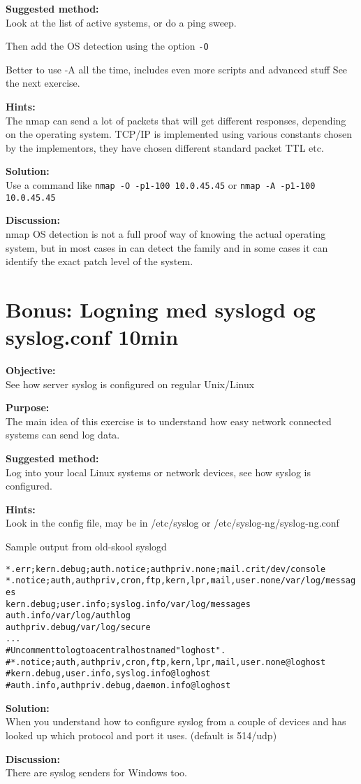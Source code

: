 \documentclass[a4paper,11pt,notitlepage]{report}
\begin{document}
{\bf Suggested method:}\\
Look at the list of active systems, or do a ping sweep.

Then add the OS detection using the option \verb+-O+

Better to use -A all the time, includes even more scripts and advanced stuff
See the next exercise.

{\bf Hints:} \\
The nmap can send a lot of packets that will get different responses, depending on the operating system. TCP/IP is implemented using various constants chosen by the implementors, they have chosen different standard packet TTL etc.

{\bf Solution:}\\
Use a command like \verb+nmap -O -p1-100 10.0.45.45+ or  \verb+nmap -A -p1-100 10.0.45.45+


{\bf Discussion:}\\
nmap OS detection is not a full proof way of knowing the actual operating system, but in most cases in can detect the family and in some cases it can identify the exact patch level of the system.


\chapter{Bonus: Logning med syslogd og syslog.conf 10min}
\label{ex:syslogd-basic}

{\bf Objective:} \\
See how server syslog is configured on regular Unix/Linux

{\bf Purpose:}\\
The main idea of this exercise is to understand how easy network connected systems can send log data.


{\bf Suggested method:}\\
Log into your local Linux systems or network devices, see how syslog is configured.

{\bf Hints:}\\
Look in the config file, may be in /etc/syslog  or /etc/syslog-ng/syslog-ng.conf

Sample output from old-skool syslogd
\begin{alltt}
\small
*.err;kern.debug;auth.notice;authpriv.none;mail.crit    /dev/console
*.notice;auth,authpriv,cron,ftp,kern,lpr,mail,user.none /var/log/messages
kern.debug;user.info;syslog.info                        /var/log/messages
auth.info                                               /var/log/authlog
authpriv.debug                                          /var/log/secure
...
# Uncomment to log to a central host named "loghost".
#*.notice;auth,authpriv,cron,ftp,kern,lpr,mail,user.none        @loghost
#kern.debug,user.info,syslog.info                               @loghost
#auth.info,authpriv.debug,daemon.info                           @loghost
\end{alltt}

{\bf Solution:}\\
When you understand how to configure syslog from a couple of devices and has looked up which protocol and port it uses. (default is 514/udp)

{\bf Discussion:}\\
There are syslog senders for Windows too.
\end{document}
